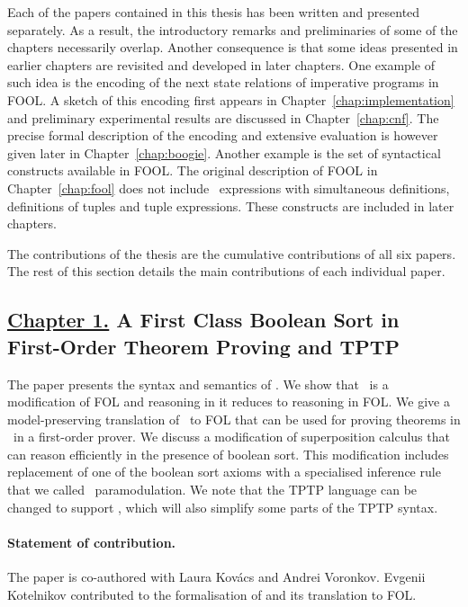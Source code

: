 Each of the papers contained in this thesis has been written and presented separately. As a result, the introductory remarks and preliminaries of some of the chapters necessarily overlap. Another consequence is that some ideas presented in earlier chapters are revisited and developed in later chapters. One example of such idea is the encoding of the next state relations of imperative programs in FOOL. A sketch of this encoding first appears in Chapter~\ref{chap:implementation} and preliminary experimental results are discussed in Chapter~\ref{chap:cnf}. The precise formal description of the encoding and extensive evaluation is however given later in Chapter~\ref{chap:boogie}. Another example is the set of syntactical constructs available in FOOL. The original description of FOOL in Chapter~\ref{chap:fool} does not include \LETIN\ expressions with simultaneous definitions, definitions of tuples and tuple expressions. These constructs are included in later chapters.

The contributions of the thesis are the cumulative contributions of all six papers. The rest of this section details the main contributions of each individual paper.

\subsection*{\hyperref[chap:fool]{Chapter 1.} A First Class Boolean Sort in\\First-Order Theorem Proving and TPTP}
The paper presents the syntax and semantics of \folb. We show that \folb\ is a modification of FOL and reasoning in it reduces to reasoning in FOL. We give a model-preserving \iffalse(modulo introduced definitions)\fi translation of \folb\ to FOL that can be used for proving theorems in \folb\ in a first-order prover. We discuss a modification of superposition calculus that can reason efficiently in the presence of boolean sort. This modification includes replacement of one of the boolean sort axioms with a specialised inference rule that we called \folb\ paramodulation. We note that the TPTP language can be changed to support \folb, which will also simplify some parts of the TPTP syntax. 

\paragraph{Statement of contribution.} The paper is co-authored with Laura Kov\'{a}cs and Andrei Voronkov. Evgenii Kotelnikov contributed to the formalisation of \folb{} and its translation to FOL.


